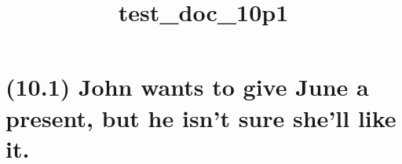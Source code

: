 \documentclass{article}
\begin{document}
%
%

\title{\textbf{test\_doc\_10p1}}
\maketitle

\clearpage

%
%

\section*{(10.1) John wants to give June a present, but he isn't sure she’ll like it.}
\end{document}
